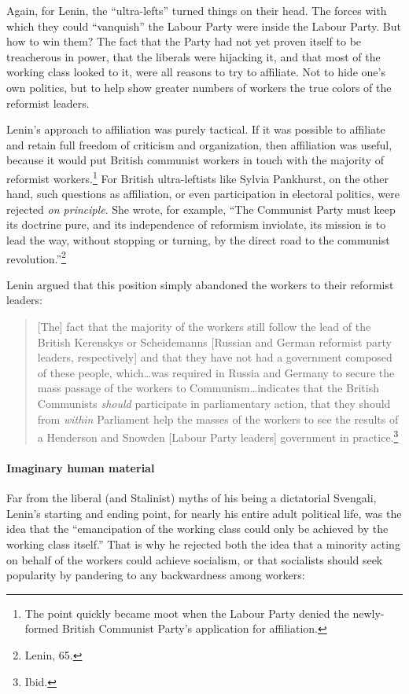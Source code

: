 Again, for Lenin, the ``ultra-lefts'' turned things on their head. The forces with which they could ``vanquish'' the Labour Party were inside the Labour Party. But how to win them? The fact that the Party had not yet proven itself to be treacherous in power, that the liberals were hijacking it, and that most of the working class looked to it, were all reasons to try to affiliate. Not to hide one's own politics, but to help show greater numbers of workers the true colors of the reformist leaders.

Lenin's approach to affiliation was purely tactical. If it was possible to affiliate and retain full freedom of criticism and organization, then affiliation was useful, because it would put British communist workers in touch with the majority of reformist workers.\footnote{The point quickly became moot when the Labour Party denied the newly-formed British Communist Party's application for affiliation.} For British ultra-leftists like Sylvia Pankhurst, on the other hand, such questions as affiliation, or even participation in electoral politics, were rejected \emph{on principle}. She wrote, for example, ``The Communist Party must keep its doctrine pure, and its independence of reformism inviolate, its mission is to lead the way, without stopping or turning, by the direct road to the communist revolution.''\footnote{Lenin, 65.}

Lenin argued that this position simply abandoned the workers to their reformist leaders:

\blockquote{[The] fact that the majority of the workers still follow the lead of the British Kerenskys or Scheidemanns [Russian and German reformist party leaders, respectively] and that they have not had a government composed of these people, which\ldots was required in Russia and Germany to secure the mass passage of the workers to Communism\ldots indicates that the British Communists \emph{should} participate in parliamentary action, that they should from \emph{within} Parliament help the masses of the workers to see the results of a Henderson and Snowden [Labour Party leaders] government in practice.\footnote{Ibid.}}

\paragraph{Imaginary human material}

Far from the liberal (and Stalinist) myths of his being a dictatorial Svengali, Lenin's starting and ending point, for nearly his entire adult political life, was the idea that the ``emancipation of the working class could only be achieved by the working class itself.'' That is why he rejected both the idea that a minority acting on behalf of the workers could achieve socialism, or that socialists should seek popularity by pandering to any backwardness among workers:

